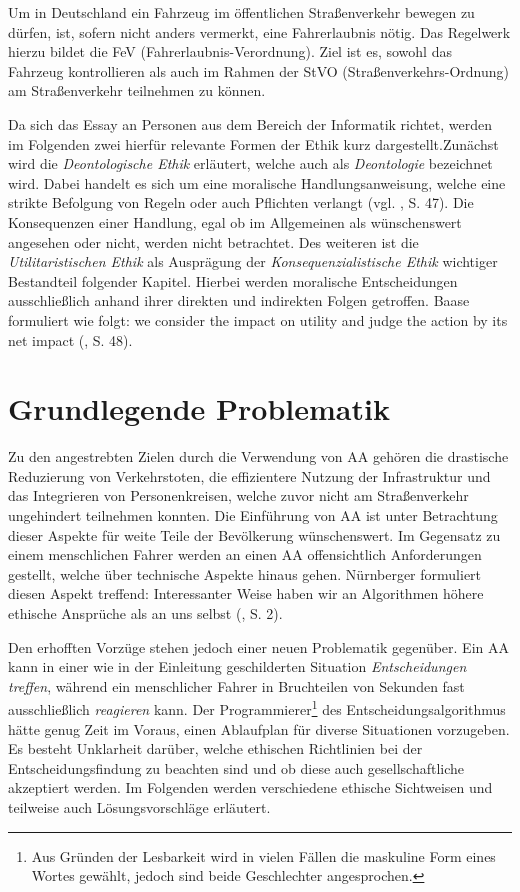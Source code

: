 \documentclass[a4paper, 12pt, titlepage]{scrartcl}
\begin{document}
	Um in Deutschland ein Fahrzeug im \"offentlichen Stra\ss enverkehr bewegen zu d\"urfen, ist, sofern nicht anders vermerkt, eine Fahrerlaubnis n\"otig. Das Regelwerk hierzu bildet die FeV (Fahrerlaubnis-Verordnung). Ziel ist es, sowohl das Fahrzeug kontrollieren als auch im Rahmen der StVO (Stra\ss enverkehrs-Ordnung) am Stra\ss enverkehr teilnehmen zu k\"onnen.
	
	Da sich das Essay an Personen aus dem Bereich der Informatik richtet, werden im Folgenden zwei hierf\"ur relevante Formen der Ethik kurz dargestellt.Zun\"achst wird die \emph{Deontologische Ethik} erl\"autert, welche auch als \emph{Deontologie} bezeichnet wird. Dabei handelt es sich um eine moralische Handlungsanweisung, welche eine strikte Befolgung von Regeln oder auch Pflichten verlangt (vgl. \autocite{baase:fire}, S. 47). Die Konsequenzen einer Handlung, egal ob im Allgemeinen als w\"unschenswert angesehen oder nicht, werden nicht betrachtet. Des weiteren ist die \emph{Utilitaristischen Ethik} als Auspr\"agung der \emph{Konsequenzialistische Ethik} wichtiger Bestandteil folgender Kapitel. Hierbei werden moralische Entscheidungen ausschlie\ss lich anhand ihrer direkten und indirekten Folgen getroffen. Baase \autocite{baase:fire} formuliert wie folgt: \glqq we consider the impact on utility and judge the action by its net impact\grqq{} (\autocite{baase:fire}, S. 48).
\section{Grundlegende Problematik}
	Zu den angestrebten Zielen durch die Verwendung von AA geh\"oren die drastische Reduzierung von Verkehrstoten, die effizientere Nutzung der Infrastruktur und das Integrieren von Personenkreisen, welche zuvor nicht am Stra\ss enverkehr ungehindert teilnehmen konnten. Die Einf\"uhrung von AA ist unter Betrachtung dieser Aspekte f\"ur weite Teile der Bev\"olkerung w\"unschenswert. Im Gegensatz zu einem menschlichen Fahrer werden an einen AA offensichtlich Anforderungen gestellt, welche \"uber technische Aspekte hinaus gehen. N\"urnberger \autocite{nunu2016} formuliert diesen Aspekt treffend: \glqq Interessanter Weise haben wir an Algorithmen höhere ethische Ansprüche als an uns selbst\grqq{} (\cite{nunu2016}, S. 2).
	
	Den erhofften Vorz\"uge stehen jedoch einer neuen Problematik gegen\"uber. Ein AA kann in einer wie in der Einleitung geschilderten Situation \emph{Entscheidungen treffen}, w\"ahrend ein menschlicher Fahrer in Bruchteilen von Sekunden fast ausschlie\ss lich \emph{reagieren} kann. Der Programmierer\footnote{Aus Gr\"unden der Lesbarkeit wird in vielen F\"allen die maskuline Form eines Wortes gew\"ahlt, jedoch sind beide Geschlechter angesprochen.} des Entscheidungsalgorithmus h\"atte genug Zeit im Voraus, einen Ablaufplan f\"ur diverse Situationen vorzugeben. Es besteht Unklarheit dar\"uber, welche ethischen Richtlinien bei der Entscheidungsfindung zu beachten sind und ob diese auch gesellschaftliche akzeptiert werden. Im Folgenden werden verschiedene ethische Sichtweisen und teilweise auch L\"osungsvorschl\"age erl\"autert.   
\end{document}
